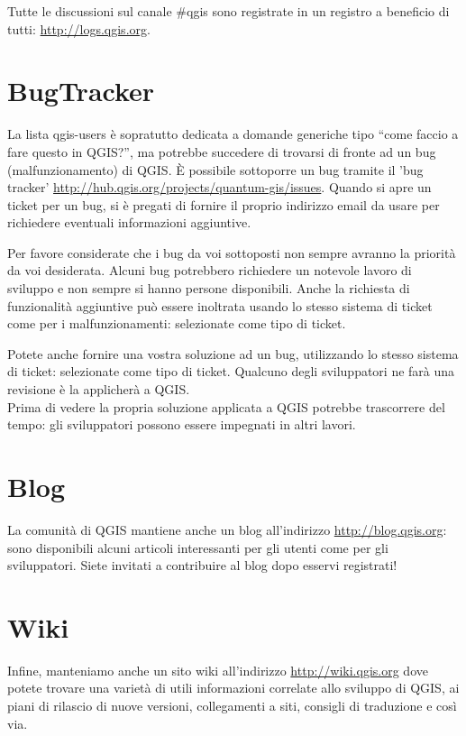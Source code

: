Tutte le discussioni sul canale \#qgis sono registrate in un registro a beneficio
di tutti: \url{http://logs.qgis.org}.

\section{BugTracker}
La lista qgis-users è sopratutto dedicata a domande generiche tipo ``come faccio a
fare questo in QGIS?'', ma potrebbe succedere di trovarsi di fronte ad un bug (malfunzionamento) di QGIS. 
È possibile sottoporre un bug tramite il 'bug tracker' \url{http://hub.qgis.org/projects/quantum-gis/issues}. 
Quando si apre un ticket per un bug, si è pregati di fornire il proprio indirizzo email da usare
per richiedere eventuali informazioni aggiuntive.

Per favore considerate che i bug da voi sottoposti non sempre avranno la priorità
da voi desiderata. Alcuni bug potrebbero richiedere un notevole lavoro di sviluppo
e non sempre si hanno persone disponibili.
Anche la richiesta di funzionalità aggiuntive può essere inoltrata usando lo stesso sistema di ticket come per 
i malfunzionamenti: selezionate  come tipo di ticket.

Potete anche fornire una vostra soluzione ad un bug, utilizzando lo stesso sistema di ticket: selezionate 
 come tipo di ticket. Qualcuno degli sviluppatori ne farà una revisione è la 
applicherà a QGIS. \\

Prima di vedere la propria soluzione applicata a QGIS potrebbe trascorrere del tempo: gli sviluppatori 
possono essere impegnati in altri lavori.


\section{Blog}
La comunità di QGIS mantiene anche un blog all'indirizzo \url{http://blog.qgis.org}: sono disponibili 
alcuni articoli interessanti per gli utenti come per gli sviluppatori. 
Siete invitati a contribuire al blog dopo esservi registrati!

\section{Wiki}
Infine, manteniamo anche un sito wiki all'indirizzo \url{http://wiki.qgis.org} dove potete trovare una varietà 
di utili informazioni correlate allo sviluppo di QGIS, ai piani di rilascio di nuove versioni, collegamenti a 
siti, consigli di traduzione e così via. 

